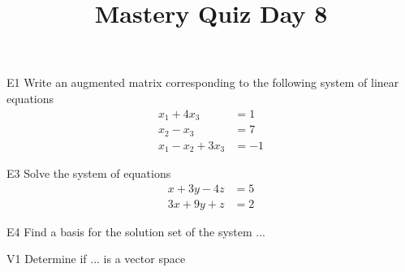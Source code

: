 \documentclass{sbgLAquiz}
\title{Mastery Quiz Day 8 }
\begin{document}
\begin{problem}{E1}
Write an augmented matrix corresponding to the following system of linear equations
\begin{align*}
x_1+4x_3 &= 1 \\
x_2-x_3 &= 7 \\
x_1-x_2+3x_3 &= -1
\end{align*}
\end{problem}
\begin{problem}{E3}
Solve the system of equations
\begin{align*}
x+3y-4z &= 5 \\
3x+9y+z &= 2
\end{align*}
\end{problem}
\begin{extract}\newpage\end{extract}
\begin{problem}{E4}
Find a basis for the solution set of the system ...
\end{problem}
\begin{problem}{V1}
Determine if ... is a vector space
\end{problem}
\begin{solution}

\end{solution}
\end{document}
